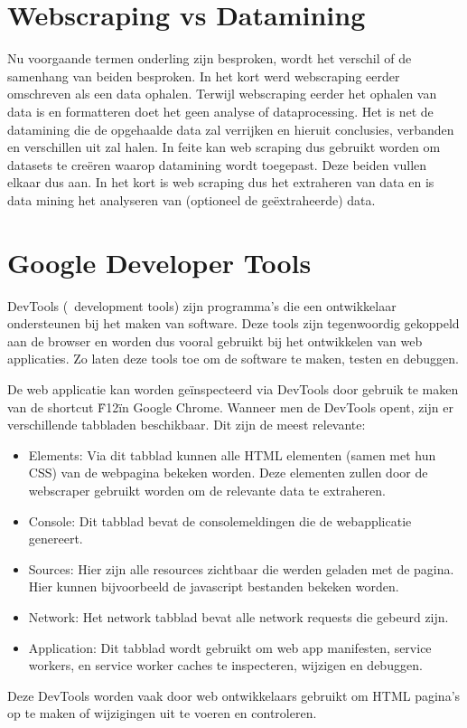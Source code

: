 \section{Webscraping vs Datamining}

Nu voorgaande termen onderling zijn besproken, wordt het verschil of de samenhang van beiden besproken. In het kort werd webscraping eerder omschreven als een data ophalen. Terwijl webscraping eerder het ophalen van data is en formatteren doet het geen analyse of dataprocessing. Het is net de datamining die de opgehaalde data zal verrijken en hieruit conclusies, verbanden en verschillen uit zal halen. In feite kan web scraping dus gebruikt worden om datasets te creëren waarop datamining wordt toegepast. Deze beiden vullen elkaar dus aan. In het kort is web scraping dus het extraheren van data en is data mining het analyseren van (optioneel de geëxtraheerde) data.

\section{Google Developer Tools}
DevTools (~development tools) zijn programma's die een ontwikkelaar ondersteunen bij het maken van software. Deze tools zijn tegenwoordig gekoppeld aan de browser en worden dus vooral gebruikt bij het ontwikkelen van web applicaties. 
Zo laten deze tools toe om de software te maken, testen en debuggen.

De web applicatie kan worden geïnspecteerd via DevTools door gebruik te maken van de shortcut \"F12\" in Google Chrome. Wanneer men de DevTools opent, zijn er verschillende tabbladen beschikbaar. Dit zijn de meest relevante:
\begin{itemize}
	\item Elements: 
		Via dit tabblad kunnen alle HTML elementen (samen met hun CSS) van de webpagina bekeken worden. Deze elementen zullen door de webscraper gebruikt worden om de relevante data te extraheren.
	\item Console:
		Dit tabblad bevat de consolemeldingen die de webapplicatie genereert.
 	\item Sources:
		Hier zijn alle resources zichtbaar die werden geladen met de pagina. Hier kunnen bijvoorbeeld de javascript bestanden bekeken worden.
	\item Network:
		Het network tabblad bevat alle network requests die gebeurd zijn.
	\item Application: 
		Dit tabblad wordt gebruikt om web app manifesten, service workers, en service worker caches te inspecteren, wijzigen en debuggen.
\end{itemize}
Deze DevTools worden vaak door web ontwikkelaars gebruikt om HTML pagina's op te maken of wijzigingen uit te voeren en controleren.


